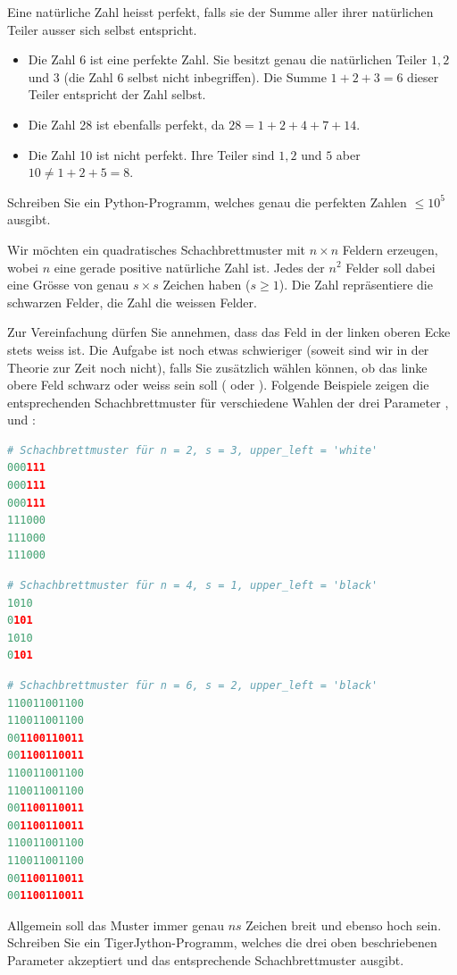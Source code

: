 \clearpage
Eine natürliche Zahl heisst perfekt, falls sie der Summe aller ihrer natürlichen Teiler ausser sich selbst entspricht.

\begin{itemize}
    \item Die Zahl 6 ist eine perfekte Zahl. Sie besitzt genau die natürlichen Teiler $1, 2$ und $3$ (die Zahl $6$ selbst nicht inbegriffen). Die Summe $1 + 2 + 3 = 6$ dieser Teiler entspricht der Zahl selbst.
    \item Die Zahl 28 ist ebenfalls perfekt, da $28 = 1 + 2 + 4 + 7 + 14$.
    \item Die Zahl 10 ist nicht perfekt. Ihre Teiler sind $1, 2$ und $5$ aber $10 \neq 1 + 2 + 5 = 8$.
\end{itemize}

\noindent
Schreiben Sie ein Python-Programm, welches genau die perfekten Zahlen $\leq 10^5$ ausgibt.

\clearpage

Wir möchten ein quadratisches Schachbrettmuster mit $n\times n$ Feldern erzeugen, wobei $n$ eine gerade positive natürliche Zahl ist.
Jedes der $n^2$ Felder soll dabei eine Grösse von genau $s\times s$ Zeichen haben ($s\geq 1$). Die Zahl  repräsentiere die schwarzen Felder, die Zahl  die weissen Felder.

\noindent
Zur Vereinfachung dürfen Sie annehmen, dass das Feld in der linken oberen Ecke stets weiss ist. Die Aufgabe ist noch etwas schwieriger (soweit sind wir in der Theorie zur Zeit noch nicht), falls Sie zusätzlich wählen können, ob das linke obere Feld schwarz oder weiss sein soll ( oder ). Folgende Beispiele zeigen die entsprechenden Schachbrettmuster für verschiedene Wahlen der drei Parameter ,  und :

\begin{lstlisting}[language=Python]
# Schachbrettmuster für n = 2, s = 3, upper_left = 'white'
000111
000111
000111
111000
111000
111000
\end{lstlisting}

\begin{lstlisting}[language=Python]
# Schachbrettmuster für n = 4, s = 1, upper_left = 'black'
1010
0101
1010
0101
\end{lstlisting}

\begin{lstlisting}[language=Python]
# Schachbrettmuster für n = 6, s = 2, upper_left = 'black'
110011001100
110011001100
001100110011
001100110011
110011001100
110011001100
001100110011
001100110011
110011001100
110011001100
001100110011
001100110011
\end{lstlisting}
Allgemein soll das Muster immer genau $ns$ Zeichen breit und ebenso hoch sein. Schreiben Sie ein TigerJython-Programm, welches die drei oben beschriebenen Parameter akzeptiert und das entsprechende Schachbrettmuster ausgibt.

